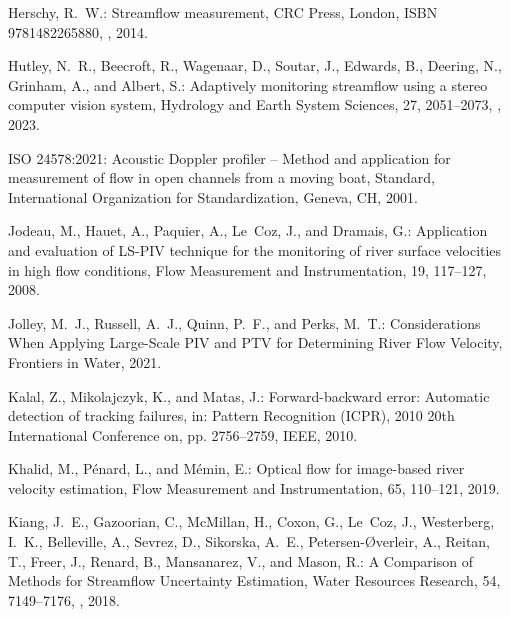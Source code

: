 \documentclass[hess, manuscript]{copernicus} %
\begin{document}
\begin{thebibliography}{68}
Herschy, R.~W.: Streamflow measurement, CRC Press, London, ISBN 9781482265880,
  , 2014.

Hutley, N.~R., Beecroft, R., Wagenaar, D., Soutar, J., Edwards, B., Deering,
  N., Grinham, A., and Albert, S.: Adaptively monitoring streamflow using a
  stereo computer vision system, Hydrology and Earth System Sciences, 27,
  2051--2073, , 2023.

ISO 24578:2021: Acoustic Doppler profiler -- Method and application for
  measurement of flow in open channels from a moving boat, Standard,
  International Organization for Standardization, Geneva, CH, 2001.

Jodeau, M., Hauet, A., Paquier, A., Le~Coz, J., and Dramais, G.: Application
  and evaluation of LS-PIV technique for the monitoring of river surface
  velocities in high flow conditions, Flow Measurement and Instrumentation, 19,
  117--127, 2008.

Jolley, M.~J., Russell, A.~J., Quinn, P.~F., and Perks, M.~T.: Considerations
  When Applying Large-Scale PIV and PTV for Determining River Flow Velocity,
  Frontiers in Water, 2021.

Kalal, Z., Mikolajczyk, K., and Matas, J.: Forward-backward error: Automatic
  detection of tracking failures, in: Pattern Recognition (ICPR), 2010 20th
  International Conference on, pp. 2756--2759, IEEE, 2010.

Khalid, M., P{\'e}nard, L., and M{\'e}min, E.: Optical flow for image-based
  river velocity estimation, Flow Measurement and Instrumentation, 65,
  110--121, 2019.

Kiang, J.~E., Gazoorian, C., McMillan, H., Coxon, G., Le~Coz, J., Westerberg,
  I.~K., Belleville, A., Sevrez, D., Sikorska, A.~E., Petersen-Øverleir, A.,
  Reitan, T., Freer, J., Renard, B., Mansanarez, V., and Mason, R.: A
  Comparison of Methods for Streamflow Uncertainty Estimation, Water Resources
  Research, 54, 7149--7176, , 2018.


\end{thebibliography}
\end{document}
